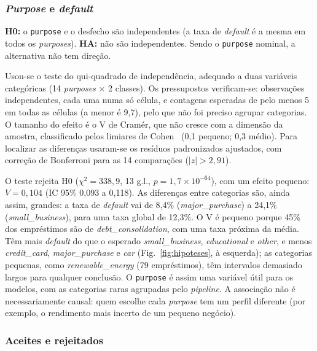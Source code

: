 \subsubsection{\textit{Purpose} e \textit{default}}

\textbf{H0:} o \texttt{purpose} e o desfecho são independentes (a taxa de \textit{default} é a
mesma em todos os \textit{purposes}). \textbf{HA:} não são independentes. Sendo o
\texttt{purpose} nominal, a alternativa não tem direção.

Usou-se o teste do qui-quadrado de independência, adequado a duas variáveis categóricas
(14 \textit{purposes} $\times$ 2 classes). Os pressupostos verificam-se: observações
independentes, cada uma numa só célula, e contagens esperadas de pelo menos 5 em todas as
células (a menor é 9,7), pelo que não foi preciso agrupar categorias. O tamanho do efeito é o V
de Cramér, que não cresce com a dimensão da amostra, classificado pelos limiares de Cohen~\cite{cohen}
(0,1 pequeno; 0,3 médio). Para localizar as diferenças usaram-se os resíduos padronizados
ajustados, com correção de Bonferroni para as 14 comparações ($|z| > 2{,}91$).

O teste rejeita H0 ($\chi^2 = 338{,}9$, 13 g.l., $p = 1{,}7 \times 10^{-64}$), com um efeito
pequeno: $V = 0{,}104$ (IC 95\% 0,093 a 0,118). As diferenças entre categorias são, ainda
assim, grandes: a taxa de \textit{default} vai de 8,4\% (\textit{major\_purchase}) a 24,1\%
(\textit{small\_business}), para uma taxa global de 12,3\%. O V é pequeno porque 45\% dos
empréstimos são de \textit{debt\_consolidation}, com uma taxa próxima da média. Têm mais
\textit{default} do que o esperado \textit{small\_business}, \textit{educational} e
\textit{other}, e menos \textit{credit\_card}, \textit{major\_purchase} e \textit{car}
(Fig.~\ref{fig:hipoteses}, à esquerda); as categorias pequenas, como \textit{renewable\_energy} (79 empréstimos), têm intervalos demasiado
largos para qualquer conclusão. O \texttt{purpose} é assim uma variável útil para os modelos,
com as categorias raras agrupadas pelo \textit{pipeline}. A associação não é necessariamente
causal: quem escolhe cada \textit{purpose} tem um perfil diferente (por exemplo, o rendimento
mais incerto de um pequeno negócio).

\subsubsection{Aceites e rejeitados}

